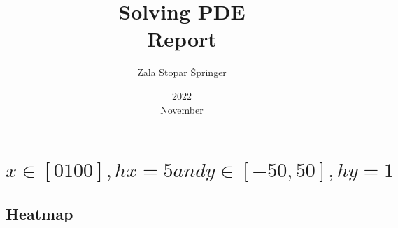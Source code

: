 \documentclass[a4paper, 16pt]{article}
\title{%
    Solving PDE\\ 
    \large Report}
\date{2022\\ November}
\author{Zala Stopar Špringer}
\begin{document}
\maketitle
{}


\newpage

\tableofcontents

\newpage
{}

\section{$x \in [0 100], hx = 5 and y \in [-50, 50], hy = 1$}

\subsection{Heatmap}
\end{document}
